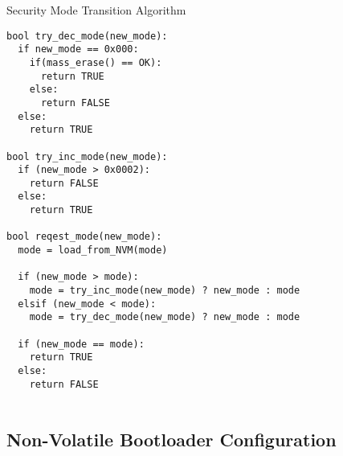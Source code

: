 \begin{docCodeSnippetTitled}{Security Mode Transition Algorithm}
\begin{verbatim}
bool try_dec_mode(new_mode):
  if new_mode == 0x000:
    if(mass_erase() == OK):
      return TRUE
    else:
      return FALSE
  else:
    return TRUE
  
bool try_inc_mode(new_mode):
  if (new_mode > 0x0002):
    return FALSE
  else:
    return TRUE

bool reqest_mode(new_mode):
  mode = load_from_NVM(mode)
  
  if (new_mode > mode): 
    mode = try_inc_mode(new_mode) ? new_mode : mode
  elsif (new_mode < mode): 
    mode = try_dec_mode(new_mode) ? new_mode : mode

  if (new_mode == mode):
    return TRUE
  else:
    return FALSE
  
\end{verbatim}
\end{docCodeSnippetTitled}

\clearpage
\subsection{Non-Volatile Bootloader Configuration} \label{sec:arch:nvm}


